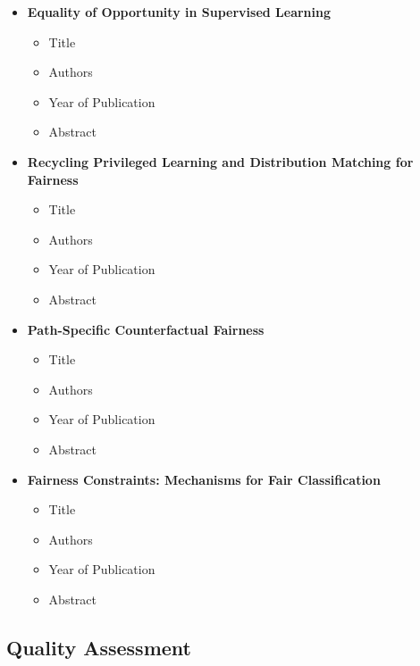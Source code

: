 \documentclass{article}
\begin{document}
\begin{itemize}
        \item \textbf{Equality of Opportunity in Supervised Learning}
        \begin{itemize}
            \item Title
            \item Authors
            \item Year of Publication
            \item Abstract
        \end{itemize}
        
        \item \textbf{Recycling Privileged Learning and Distribution Matching for Fairness}
        \begin{itemize}
            \item Title
            \item Authors
            \item Year of Publication
            \item Abstract
        \end{itemize}
        
        \item \textbf{Path-Specific Counterfactual Fairness}
        \begin{itemize}
            \item Title
            \item Authors
            \item Year of Publication
            \item Abstract
        \end{itemize}
        
        \item \textbf{Fairness Constraints: Mechanisms for Fair Classification}
        \begin{itemize}
            \item Title
            \item Authors
            \item Year of Publication
            \item Abstract
        \end{itemize}
    \end{itemize}

    \subsection{Quality Assessment}
\end{document}
